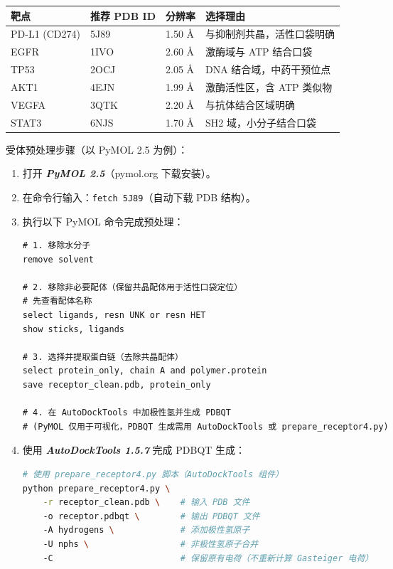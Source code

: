 \documentclass[12pt,a4paper,twoside]{article}
\newcommand{\software}[1]{\textbf{\textit{#1}}}
\begin{document}
\begin{center}
\begin{tabular}{p{2.5cm}p{2cm}p{2cm}p{6cm}}
\toprule
\textbf{靶点} & \textbf{推荐 PDB ID} & \textbf{分辨率} & \textbf{选择理由} \\
\midrule
PD-L1 (CD274) & 5J89 & 1.50 Å & 与抑制剂共晶，活性口袋明确 \\
EGFR & 1IVO & 2.60 Å & 激酶域与 ATP 结合口袋 \\
TP53 & 2OCJ & 2.05 Å & DNA 结合域，中药干预位点 \\
AKT1 & 4EJN & 1.99 Å & 激酶活性区，含 ATP 类似物 \\
VEGFA & 3QTK & 2.20 Å & 与抗体结合区域明确 \\
STAT3 & 6NJS & 1.70 Å & SH2 域，小分子结合口袋 \\
\bottomrule
\end{tabular}
\end{center}

受体预处理步骤（以 PyMOL 2.5 为例）：

\begin{enumerate}
  \item 打开 \software{PyMOL 2.5}（pymol.org 下载安装）。
  \item 在命令行输入：\texttt{fetch 5J89}（自动下载 PDB 结构）。
  \item 执行以下 PyMOL 命令完成预处理：
\begin{lstlisting}[language={},caption={PyMOL 受体预处理命令}]
# 1. 移除水分子
remove solvent

# 2. 移除非必要配体（保留共晶配体用于活性口袋定位）
# 先查看配体名称
select ligands, resn UNK or resn HET
show sticks, ligands

# 3. 选择并提取蛋白链（去除共晶配体）
select protein_only, chain A and polymer.protein
save receptor_clean.pdb, protein_only

# 4. 在 AutoDockTools 中加极性氢并生成 PDBQT
# (PyMOL 仅用于可视化，PDBQT 生成需用 AutoDockTools 或 prepare_receptor4.py)
\end{lstlisting}

  \item 使用 \software{AutoDockTools 1.5.7} 完成 PDBQT 生成：
\begin{lstlisting}[language=bash,caption={AutoDockTools 受体转换命令}]
# 使用 prepare_receptor4.py 脚本（AutoDockTools 组件）
python prepare_receptor4.py \
    -r receptor_clean.pdb \    # 输入 PDB 文件
    -o receptor.pdbqt \        # 输出 PDBQT 文件
    -A hydrogens \             # 添加极性氢原子
    -U nphs \                  # 非极性氢原子合并
    -C                         # 保留原有电荷（不重新计算 Gasteiger 电荷）
\end{lstlisting}
\end{enumerate}
\end{document}
